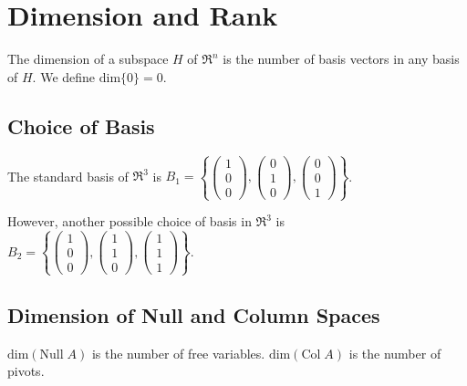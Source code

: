 \section{Dimension and Rank}
\begin{definition}
    The dimension of a subspace \(H\) of \(\Re^n\) is the number of basis vectors in any basis of \(H\). We define \(\text{dim}\{0\}=0\).
\end{definition}

\subsection{Choice of Basis}
The standard basis of \(\Re^3\) is \(B_1= \left\{ \begin{pmatrix}
    1 \\ 0 \\ 0
\end{pmatrix}, \begin{pmatrix}
    0 \\ 1 \\ 0
\end{pmatrix}, \begin{pmatrix}
    0 \\ 0 \\ 1
\end{pmatrix}
\right\}\).

\noindent
\newline
However, another possible choice of basis in \(\Re^3\) is \(B_2= \left\{ \begin{pmatrix}
    1 \\ 0 \\ 0
\end{pmatrix}, \begin{pmatrix}
    1 \\ 1 \\ 0
\end{pmatrix}, \begin{pmatrix}
    1 \\ 1 \\ 1
\end{pmatrix}
\right\}\).

\subsection{Dimension of Null and Column Spaces}
\(\text{dim}(\text{Null} \; A)\) is the number of free variables. \(\text{dim}(\text{Col} \; A)\) is the number of pivots.